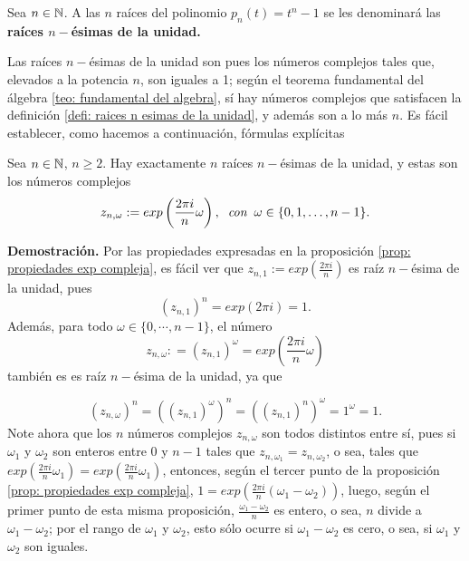 \begin{defi}
\label{defi: raices n esimas de la unidad}
Sea $n \in \mathbb{N}$. A las $n$ raíces del polinomio
$p_{n}(t)= t^{n}-1$ se les denominará las \textbf{raíces $n-$ésimas de la unidad.}
\end{defi}


Las raíces $n-$ésimas de la unidad son pues los números complejos
tales que, elevados a la potencia $n$, son iguales a 1; según el 
teorema fundamental
del álgebra \ref{teo: fundamental del algebra}, sí hay números complejos
que satisfacen la definición \ref{defi: raices n esimas de la unidad}, y además
son a lo más $n$. Es fácil establecer, como hacemos a continuación, 
fórmulas explícitas 

\begin{prop}
Sea $n \in \mathbb{N}$, $n \geq 2$. Hay exactamente $n$ raíces $n-$ésimas de la
unidad, y estas son los números complejos
 	\begin{equation}
	\label{eq3: 8ab}
	z_{n, \omega} : = exp \left( \frac{2 \pi i }{n} \omega
	\right), \hspace*{0.2cm} \textit{con} 
	\hspace*{0.2cm} \omega \in \{0, 1, \ldots, n-1 \}.
	\end{equation}
	
\end{prop}
\noindent
\textbf{Demostración.}
Por las propiedades expresadas en la proposición
\ref{prop: propiedades exp compleja}, es fácil ver que 
$z_{n,1} :=  exp \left( \frac{2 \pi i }{n} \right)$ es raíz $n-$ésima
de la unidad, pues
\[
(z_{n,1})^{n} = exp(2 \pi i ) = 1.
\]
Además, para todo $\omega \in \{ 0, \cdots , n-1 \}$, el número
\[
z_{n, \omega} : = (z_{n,1})^{\omega} = exp \left( \frac{2 \pi i }{n} \omega \right)
\]
también es es raíz $n-$ésima de la unidad, ya que

\[
(z_{n, \omega})^{n} = ((z_{n,1})^{\omega} )^{n} = 
((z_{n,1})^{n} )^{\omega} = 1^{\omega}=1. 
\]
Note ahora que los $n$ números complejos $z_{n, \omega}$ son todos 
distintos entre sí, pues si $\omega_{1}$ y $\omega_{2}$ son enteros
entre $0$ y $n-1$ tales que $z_{n, \omega_{1}} = z_{n, \omega_{2}}$,
o sea, tales que 
$exp \left( \frac{2 \pi i }{n} \omega_{1} \right) = 
exp \left( \frac{2 \pi i }{n} \omega_{1} \right)$, entonces, según el tercer
punto de la proposición \ref{prop: propiedades exp compleja},
$1 = exp \left( \frac{2 \pi i }{n} (\omega_{1}-\omega_{2}) \right)$, luego, 
según el primer punto de esta misma proposición, $\frac{\omega_{1}-\omega_{2}}{n}$
es entero, o sea, $n$ divide a $\omega_{1}-\omega_{2}$; por el rango de 
$\omega_{1}$ y $\omega_{2}$, esto sólo ocurre si $\omega_{1}-\omega_{2}$ es
cero, o sea, si $\omega_{1}$ y $\omega_{2}$
son iguales.
\QEDB
\vspace{0.2cm}

